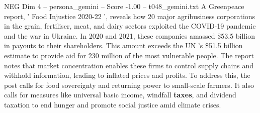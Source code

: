 \begin{textsample}{NEG Dim 4 – persona\_gemini – Score -1.00 – t048\_gemini.txt}  \label{ex:f4_neg_001}
A Greenpeace report, ' Food Injustice 2020-22 ', reveals how 20 major agribusiness corporations in the grain, fertiliser, meat, and dairy sectors exploited the COVID-19 pandemic and the war in Ukraine.
In 2020 and 2021, these companies amassed \$53.5 billion in payouts to their shareholders.
This amount exceeds the UN 's \$51.5 billion estimate to provide aid for 230 million of the most vulnerable people.
The report notes that market concentration enables these firms to control supply chains and withhold information, leading to inflated prices and profits.
To address this, the post calls for food sovereignty and returning power to small-scale farmers.
It also calls for measures like universal basic income, windfall \textbf{taxes}, and dividend taxation to end hunger and promote social justice amid climate crises.

\end{textsample}
